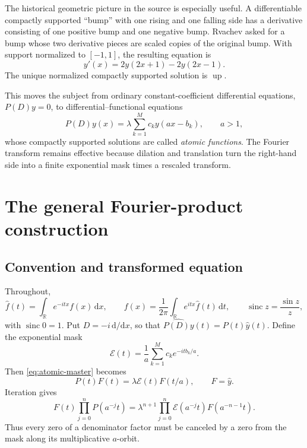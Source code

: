 \documentclass[11pt]{article}
\theoremstyle{definition}
\theoremstyle{remark}
\newcommand{\Up}{\operatorname{up}}
\newcommand{\sinc}{\operatorname{sinc}}
\newcommand{\R}{\mathbb{R}}
\newcommand{\dd}{\,\mathrm{d}}
\begin{document}
The historical geometric picture in the source is especially useful.  A differentiable compactly supported ``bump'' with one rising and one falling side has a derivative consisting of one positive bump and one negative bump.  Rvachev asked for a bump whose two derivative pieces are scaled copies of the original bump.  With support normalized to \([-1,1]\), the resulting equation is
\begin{equation}
  y'(x)=2y(2x+1)-2y(2x-1).
  \label{eq:up-dfe-intro}
\end{equation}
The unique normalized compactly supported solution is \(\Up\).

This moves the subject from ordinary constant-coefficient differential equations,
\(P(D)y=0\), to differential--functional equations
\begin{equation}
  P(D)y(x)=\lambda\sum_{k=1}^{M}c_k y(ax-b_k),
  \qquad a>1,
  \label{eq:atomic-master}
\end{equation}
whose compactly supported solutions are called \emph{atomic functions}.  The Fourier transform remains effective because dilation and translation turn the right-hand side into a finite exponential mask times a rescaled transform.

\section{The general Fourier-product construction}
\label{sec:atomic-general}

\subsection{Convention and transformed equation}

Throughout,
\begin{equation}
  \widehat f(t)=\int_{\R}e^{-itx}f(x)\dd x,
  \qquad
  f(x)=\frac1{2\pi}\int_{\R}e^{itx}\widehat f(t)\dd t,
  \qquad \sinc z=\frac{\sin z}{z},
  \label{eq:fourier-convention}
\end{equation}
with \(\sinc 0=1\).  Put \(D=-i\,\mathrm d/\mathrm dx\), so that
\(\widehat{P(D)y}(t)=P(t)\widehat y(t)\).  Define the exponential mask
\begin{equation}
  \mathcal E(t)=\frac1a\sum_{k=1}^{M}c_k e^{-itb_k/a}.
  \label{eq:mask-E}
\end{equation}
Then \eqref{eq:atomic-master} becomes
\begin{equation}
  P(t)F(t)=\lambda\mathcal E(t)F(t/a),
  \qquad F=\widehat y.
  \label{eq:fourier-refinement}
\end{equation}
Iteration gives
\begin{equation}
  F(t)\prod_{j=0}^{n}P(a^{-j}t)
   =\lambda^{n+1}\prod_{j=0}^{n}\mathcal E(a^{-j}t)F(a^{-n-1}t).
  \label{eq:finite-iteration}
\end{equation}
Thus every zero of a denominator factor must be canceled by a zero from the mask along its multiplicative \(a\)-orbit.
\end{document}
